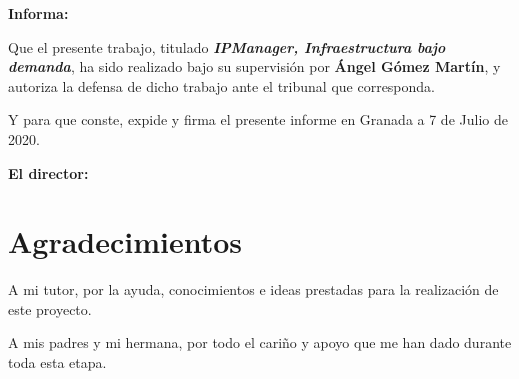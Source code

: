 \vspace{0.5cm}

\textbf{Informa:}

\vspace{0.5cm}

Que el presente trabajo, titulado \textit{\textbf{IPManager, Infraestructura bajo demanda}},
ha sido realizado bajo su supervisión por \textbf{Ángel Gómez Martín}, y autoriza la defensa de dicho trabajo ante el tribunal que corresponda.

\vspace{0.5cm}

Y para que conste, expide y firma el presente informe en Granada a 7 de Julio de 2020.

\vspace{1cm}

\textbf{El director:}

\vspace{5cm}









\chapter*{Agradecimientos}
\thispagestyle{empty}
\vspace{1cm}

A mi tutor, por la ayuda, conocimientos e ideas prestadas para la realización de este proyecto.

\bigskip
A mis padres y mi hermana, por todo el cariño y apoyo que me han dado durante toda esta etapa.

